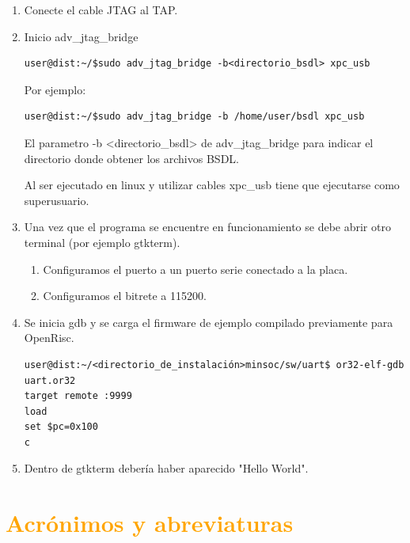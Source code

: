 \begin{enumerate}

\item Conecte el cable JTAG al TAP.
\item Inicio adv\_jtag\_bridge

\begin{verbatim}
user@dist:~/$sudo adv_jtag_bridge -b<directorio_bsdl> xpc_usb 
\end{verbatim}

Por ejemplo:

\begin{verbatim}
user@dist:~/$sudo adv_jtag_bridge -b /home/user/bsdl xpc_usb 
\end{verbatim}
El parametro -b <directorio\_bsdl> de adv\_jtag\_bridge para indicar el directorio donde obtener los archivos BSDL.

Al ser ejecutado en linux y utilizar cables xpc\_usb tiene que ejecutarse como superusuario.


\item Una vez que el programa se encuentre en funcionamiento se debe abrir otro terminal (por ejemplo gtkterm).
\begin{enumerate}


\item Configuramos el puerto a un puerto serie conectado a la placa.
\item Configuramos el bitrete a 115200.
\end{enumerate}

\item Se inicia gdb y se carga el firmware de ejemplo compilado previamente para OpenRisc.

\begin{verbatim}
user@dist:~/<directorio_de_instalación>minsoc/sw/uart$ or32-elf-gdb uart.or32
target remote :9999
load
set $pc=0x100
c
\end{verbatim}
\item Dentro de gtkterm debería haber aparecido "Hello World". 

 \end{enumerate} 


\newpage

\section{\textcolor{orange}{Acrónimos y abreviaturas}}

